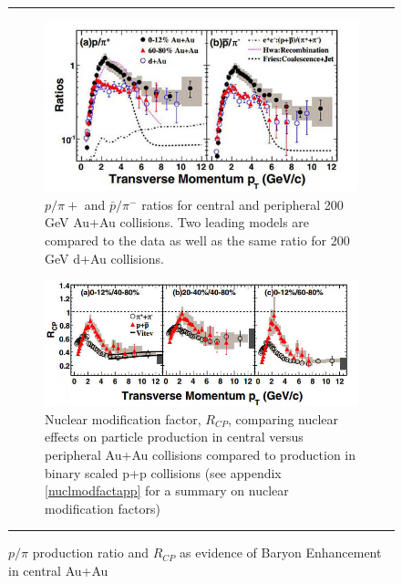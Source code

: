 \begin{figure}
\centering    \rule{35em}{0.5pt}
\begin{subfigure}[b]{0.7\textwidth}
    \centering
    \includegraphics[width=\textwidth]{prevplots/ppiratiocentvsperiph.JPG}
    \caption{ $p/\pi{+}$ and $\bar{p}/\pi^{-}$ ratios for central and peripheral 200 GeV Au+Au collisions. Two leading models are compared to the data as well as the same ratio for 200 GeV d+Au collisions.}
    \label{fig:ppiratiocentvsperiph}
\end{subfigure}
\begin{subfigure}[b]{0.8\textwidth}
    \centering
    \includegraphics[width=\textwidth]{prevplots/Rcpcentvsperiph.jpg}
    \caption{Nuclear modification factor, $R_{CP}$, comparing nuclear effects on particle production in central versus peripheral Au+Au collisions compared to production in binary scaled p+p collisions (see appendix \ref{nuclmodfactapp} for a summary on nuclear modification factors)}
    \label{fig:Rcpcentvsperiph}
\end{subfigure}
\rule{35em}{0.5pt}
\caption[Evidence of Baryon Enhancement in Au+Au collisions]{$p/\pi$ production ratio and $R_{CP}$ as evidence of Baryon Enhancement in central Au+Au}
\label{fig:baryonenhancementAA}    
\end{figure}

